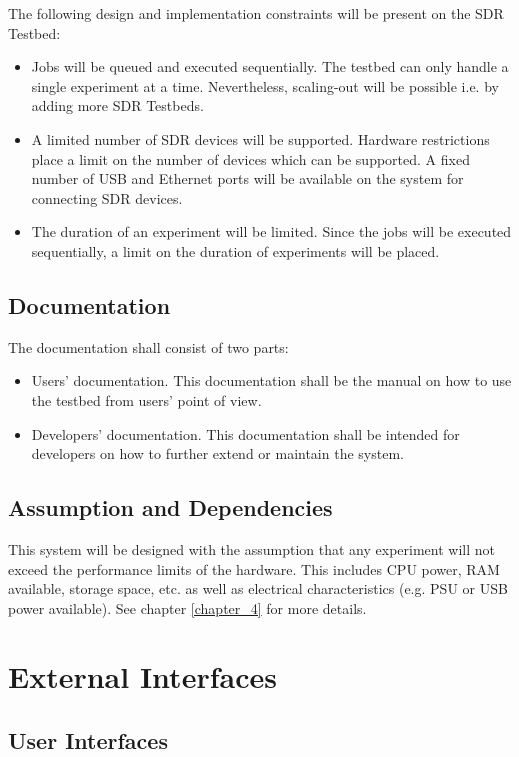 \documentclass[english,titlepage,a4paper]{report}
\begin{document}
The following design and implementation constraints will be present on the SDR Testbed:
\begin{itemize}
\item Jobs will be queued and executed sequentially.
  The testbed can only handle a single experiment at a time.
  Nevertheless, scaling-out will be possible i.e. by adding more SDR Testbeds.
\item A limited number of SDR devices will be supported.
  Hardware restrictions place a limit on the number of devices which can be supported.
  A fixed number of USB and Ethernet ports will be available on the system for connecting SDR devices.
\item The duration of an experiment will be limited.
  Since the jobs will be executed sequentially, a limit on the duration of experiments will be placed.
\end{itemize}

\section{Documentation}

The documentation shall consist of two parts:
\begin{itemize}
\item Users' documentation.
  This documentation shall be the manual on how to use the testbed from users' point of view.
\item Developers' documentation.
  This documentation shall be intended for developers on how to further extend or maintain the system.
\end{itemize}

\section{Assumption and Dependencies}

This system will be designed with the assumption that any experiment will not exceed the performance limits of the hardware.
This includes CPU power, RAM available, storage space, etc. as well as electrical characteristics (e.g. PSU or USB power available).
See chapter \ref{chapter_4} for more details.


\chapter{External Interfaces}
\section{User Interfaces}
\end{document}
